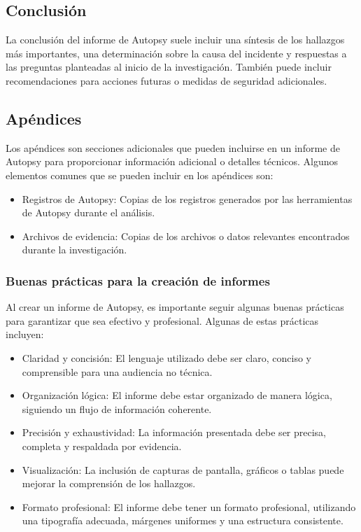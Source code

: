 \documentclass{article}
\begin{document}
\subsection*{Conclusión}
La conclusión del informe de Autopsy suele incluir una
síntesis de los hallazgos más importantes, una determinación
sobre la causa del incidente y respuestas a las preguntas
planteadas al inicio de la investigación. También puede
incluir recomendaciones para acciones futuras o medidas de
seguridad adicionales.

\subsection*{Apéndices}
Los apéndices son secciones adicionales que pueden incluirse
en un informe de Autopsy para proporcionar información
adicional o detalles técnicos. Algunos elementos comunes
que se pueden incluir en los apéndices son:
\begin{itemize}
    \item
    Registros de Autopsy: Copias de los registros generados por las herramientas de Autopsy durante el análisis.
    \item
    Archivos de evidencia: Copias de los archivos o datos relevantes encontrados durante la investigación.
\end{itemize}

\subsubsection*{Buenas prácticas para la creación de informes}
Al crear un informe de Autopsy, es importante seguir algunas
buenas prácticas para garantizar que sea efectivo y profesional. Algunas de estas prácticas incluyen:
\begin{itemize}
    \item
    Claridad y concisión: El lenguaje utilizado debe ser claro, conciso y comprensible para una audiencia no técnica.
    \item
    Organización lógica: El informe debe estar organizado de manera lógica, siguiendo un flujo de información coherente.
    \item
    Precisión y exhaustividad: La información presentada debe ser precisa, completa y respaldada por evidencia.
    \item
    Visualización: La inclusión de capturas de pantalla, gráficos o tablas puede mejorar la comprensión de los hallazgos.
    \item
    Formato profesional: El informe debe tener un formato profesional, utilizando una tipografía adecuada, márgenes uniformes y una estructura consistente.
\end{itemize}
\end{document}
